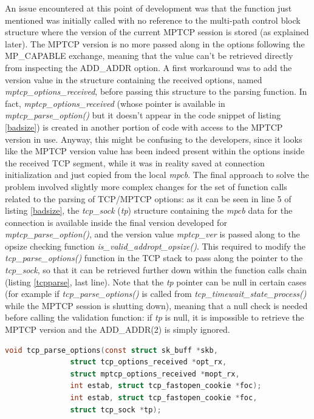 An issue encountered at this point of development was that the function just mentioned was initially called with no reference to the multi-path control block structure where the version of the current MPTCP session is stored (as explained later). The MPTCP version is no more passed along in the options following the MP\_CAPABLE exchange, meaning that the value can't be retrieved directly from inspecting the ADD\_ADDR option. A first workaround was to add the version value in the structure containing the received options, named \textit{mptcp\_options\_received}, before passing this structure to the parsing function. In fact, \textit{mptcp\_options\_received} (whose pointer is available in \textit{mptcp\_parse\_option()} but it doesn't appear in the code snippet of listing \ref{badsize}) is created in another portion of code with access to the MPTCP version in use. Anyway, this might be confusing to the developers, since it looks like the MPTCP version value has been indeed present within the options inside the received TCP segment, while it was in reality saved at connection initialization and just copied from the local \textit{mpcb}. The final approach to solve the problem involved slightly more complex changes for the set of function calls related to the parsing of TCP/MPTCP options: as it can be seen in line 5 of listing \ref{badsize}, the \textit{tcp\_sock} (\textit{tp}) structure containing the \textit{mpcb} data for the connection is available inside the final version developed for \textit{mptcp\_parse\_option()}, and the version value \textit{mptcp\_ver} is passed along to the opsize checking function \textit{is\_valid\_addropt\_opsize()}. This required to modify the \textit{tcp\_parse\_options()} function in the TCP stack to pass along the pointer to the \textit{tcp\_sock}, so that it can be retrieved further down within the function calls chain (listing \ref{tcpparse}, last line). Note that the \textit{tp} pointer can be null in certain cases (for example if \textit{tcp\_parse\_options()} is called from \textit{tcp\_timewait\_state\_process()} while the MPTCP session is shutting down), meaning that a null check is needed before calling the validation function: if \textit{tp} is null, it is impossible to retrieve the MPTCP version and the ADD\_ADDR(2) is simply ignored.

\begin{lstlisting}[language=c, caption=\textit{New definition for \textit{tcp\_parse\_options}}, label=tcpparse]
void tcp_parse_options(const struct sk_buff *skb,
 		       struct tcp_options_received *opt_rx,
 		       struct mptcp_options_received *mopt_rx,
		       int estab, struct tcp_fastopen_cookie *foc);
		       int estab, struct tcp_fastopen_cookie *foc,
		       struct tcp_sock *tp);
\end{lstlisting}

